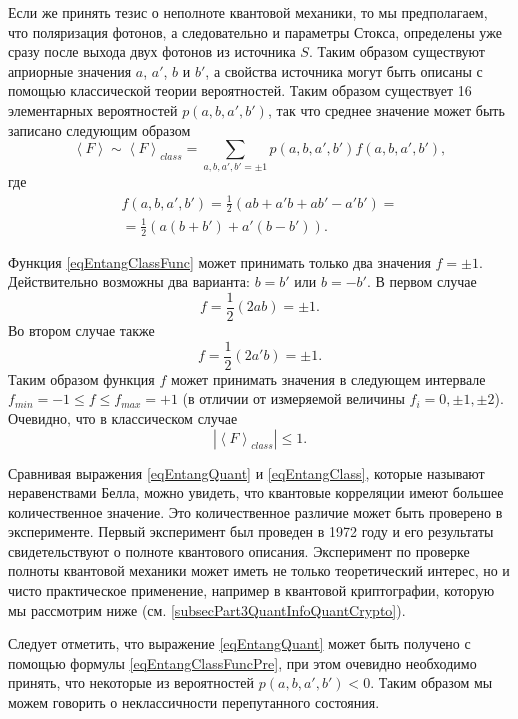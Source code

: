 Если же принять тезис о неполноте квантовой механики, то мы
предполагаем, что поляризация фотонов, а следовательно и параметры
Стокса, определены уже сразу после выхода двух фотонов из источника
$S$.  
Таким образом существуют априорные значения $a$, $a'$, $b$ и $b'$,
а свойства источника могут быть описаны с помощью
классической теории вероятностей.
Таким образом существует 16 элементарных
вероятностей $p\left(a,b,a',b'\right)$, так что среднее значение может
быть записано следующим образом
\begin{equation}
 \left<F\right> \sim \left<F\right>_{class} 
=\sum_{a,b,a',b'=\pm 1} 
p\left(a,b,a',b'\right) f\left(a,b,a',b'\right),
\label{eqEntangClassFuncPre}
\end{equation}
где 
\begin{eqnarray}
 f\left(a,b,a',b'\right) = \frac{1}{2} 
\left(
ab + a'b + ab' - a'b'
\right) = 
\nonumber \\
=
\frac{1}{2} 
\left(
a \left(b + b'\right) + a' \left(b - b'\right)
\right).
\label{eqEntangClassFunc}
\end{eqnarray}

Функция \eqref{eqEntangClassFunc} может принимать только два значения
$f = \pm 1$. Действительно возможны два варианта: $b = b'$ или $b = - b'$. В
первом случае 
\[
f = \frac{1}{2}\left(2ab\right) = \pm 1.
\]
Во втором случае также 
\[
f = \frac{1}{2}\left(2a'b\right) = \pm 1.
\]
Таким образом функция $f$ может принимать значения в следующем
интервале $f_{min} = -1 \le f \le f_{max} = +1$ (в отличии от измеряемой величины
$f_i = 0, \pm 1, \pm 2$). Очевидно, что в классическом случае
\begin{equation}
\left|\left<F\right>_{class} \right| 
\le 1.
\label{eqEntangClass}
\end{equation}

Сравнивая выражения \eqref{eqEntangQuant} и \eqref{eqEntangClass},
которые называют неравенствами Белла,
можно увидеть, что квантовые корреляции имеют большее количественное
значение. Это количественное различие может быть проверено в
эксперименте. Первый эксперимент был проведен в 1972 году
\cite{PhysRevLett.28.938} и его результаты свидетельствуют о
полноте квантового описания. Эксперимент по проверке полноты квантовой
механики может иметь не только теоретический интерес, но и чисто
практическое применение, например в квантовой криптографии, которую мы
рассмотрим ниже (см. \ref{subsecPart3QuantInfoQuantCrypto}). 

Следует отметить, что выражение \eqref{eqEntangQuant} может быть
получено с помощью формулы  \eqref{eqEntangClassFuncPre}, при этом
очевидно необходимо принять, что некоторые из вероятностей
$p\left(a,b,a',b'\right) < 0$. Таким образом мы можем говорить о
неклассичности перепутанного состояния.  
